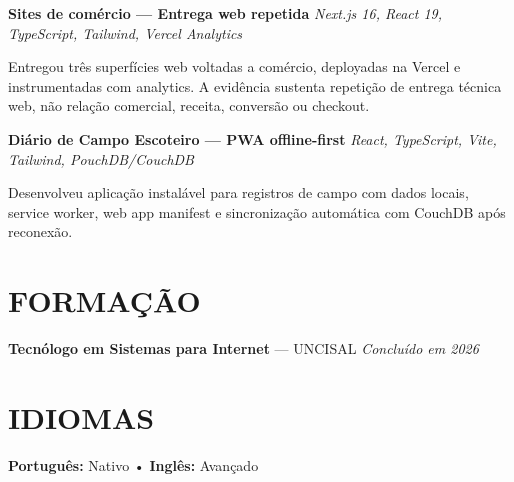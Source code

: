\documentclass[10pt,a4paper]{article}
\begin{document}
\vspace{0.5pt}

\noindent
\textbf{Sites de comércio — Entrega web repetida}
\hfill
\textit{Next.js 16, React 19, TypeScript, Tailwind, Vercel Analytics}

\footnotesize

Entregou três superfícies web voltadas a comércio, deployadas na Vercel e instrumentadas com analytics. A evidência sustenta repetição de entrega técnica web, não relação comercial, receita, conversão ou checkout.

\vspace{0.5pt}

\noindent
\textbf{Diário de Campo Escoteiro — PWA offline-first}
\hfill
\textit{React, TypeScript, Vite, Tailwind, PouchDB/CouchDB}

\footnotesize

Desenvolveu aplicação instalável para registros de campo com dados locais, service worker, web app manifest e sincronização automática com CouchDB após reconexão.

\section*{FORMAÇÃO}

\noindent
\textbf{Tecnólogo em Sistemas para Internet} — UNCISAL
\hfill
\textit{Concluído em 2026}


\section*{IDIOMAS}

\noindent
\textbf{Português:} Nativo
\quad • \quad
\textbf{Inglês:} Avançado 
\end{document}
